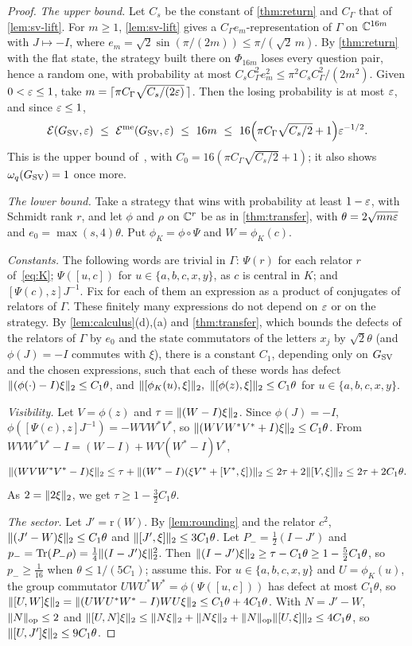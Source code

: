 \begin{proof}
\emph{The upper bound.} Let $C_s$ be the constant of \cref{thm:return} and $C_\Gamma$ that of \cref{lem:sv-lift}. For $m\ge1$,
\cref{lem:sv-lift} gives a $C_\Gamma e_m$-representation of $\Gamma$ on $\mathbb C^{16m}$ with $J\mapsto-I$, where
$e_m=\sqrt2\sin(\pi/(2m))\le\pi/(\sqrt2\,m)$. By \cref{thm:return} with the flat state, the strategy built there on $\Phi_{16m}$ loses every
question pair, hence a random one, with probability at most $C_sC_\Gamma^2e_m^2\le\pi^2C_sC_\Gamma^2/(2m^2)$. Given $0<\varepsilon\le1$, take
$m=\lceil\pi C_\Gamma\sqrt{C_s/(2\varepsilon)}\,\rceil$. Then the losing probability is at most $\varepsilon$, and since $\varepsilon\le1$,
\[
\Ent(\Gsv,\eps)\ \le\ \Entme(\Gsv,\eps)\ \le\ 16m\ \le\ 16\Bigl(\pi C_\Gamma\sqrt{C_s/2}+1\Bigr)\eps^{-1/2}.
\]
This is the upper bound of~\cite[Theorem~1.1]{SV18}, with $C_0=16(\pi C_\Gamma\sqrt{C_s/2}+1)$; it also shows $\omega_{q}(G_{\mathrm{SV}})=1$ once more.

\emph{The lower bound.} Take a strategy that wins with probability at least $1-\varepsilon$, with
Schmidt rank $r$, and let $\phi$ and $\rho$ on $\mathbb C^r$ be as in \cref{thm:transfer}, with $\theta=2\sqrt{mn\varepsilon}$ and $e_0=\max(s,4)\theta$.
Put $\phi_K=\phi\circ\Psi$ and $W=\phi_K(c)$.

\emph{Constants.} The following words are trivial in $\Gamma$: $\Psi(r)$ for each relator $r$ of~\eqref{eq:K}; $\Psi([u,c])$ for
$u\in\{a,b,c,x,y\}$, as $c$ is central in $K$; and $[\Psi(c),z]J^{-1}$. Fix for each of them an expression as a product of conjugates of
relators of $\Gamma$. These finitely many expressions do not depend on $\varepsilon$ or on the strategy. By \cref{lem:calculus}(d),(a) and
\cref{thm:transfer}, which bounds the defects of the relators of $\Gamma$ by $e_0$ and the state commutators of the letters $x_j$ by
$\sqrt2\theta$ (and $\phi(J)=-I$ commutes with $\xi$), there is a constant $C_1$, depending only on $G_{\mathrm{SV}}$ and the chosen expressions, such that each of these words has
defect $\lVert (\phi(\cdot)-I)\xi\rVert_2\le C_1\theta$, and $\lVert [\phi_K(u),\xi]\rVert_2,\ \lVert [\phi(z),\xi]\rVert_2\le C_1\theta$ for $u\in\{a,b,c,x,y\}$.

\emph{Visibility.} Let $V=\phi(z)$ and $\tau=\lVert (W-I)\xi\rVert_2$. Since $\phi(J)=-I$, $\phi([\Psi(c),z]J^{-1})=-WVW^*V^*$, so
$\lVert (WVW^*V^*+I)\xi\rVert_2\le C_1\theta$. From $WVW^*V^*-I=(W-I)+WV(W^*-I)V^*$,
\[
\lVert (WVW^*V^*-I)\xi\rVert_2\le\tau+\lVert (W^*-I)(\xi V^*+[V^*,\xi])\rVert_2\le2\tau+2\lVert [V,\xi]\rVert_2\le2\tau+2C_1\theta .
\]
As $2=\lVert 2\xi\rVert_2$, we get $\tau\ge1-\frac32C_1\theta$.

\emph{The sector.} Let $J'=\mathrm r(W)$. By \cref{lem:rounding} and the relator $c^2$, $\lVert (J'-W)\xi\rVert_2\le C_1\theta$ and
$\lVert [J',\xi]\rVert_2\le3C_1\theta$. Let $P_-=\frac12(I-J')$ and $p_-=\operatorname{Tr}(P_-\rho)=\frac14\lVert (I-J')\xi\rVert_2^2$. Then $\lVert (I-J')\xi\rVert_2\ge\tau-C_1\theta\ge1-\frac52C_1\theta$,
so $p_-\ge\frac1{16}$ when $\theta\le1/(5C_1)$; assume this. For $u\in\{a,b,c,x,y\}$ and $U=\phi_K(u)$, the group commutator
$UWU^*W^*=\phi(\Psi([u,c]))$ has defect at most $C_1\theta$, so $\lVert [U,W]\xi\rVert_2=\lVert (UWU^*W^*-I)WU\xi\rVert_2\le C_1\theta+4C_1\theta$. With
$N=J'-W$, $\lVert N\rVert_{\mathrm{op}}\le2$ and $\lVert [U,N]\xi\rVert_2\le\lVert N\xi\rVert_2+\lVert N\xi\rVert_2+\lVert N\rVert_{\mathrm{op}}\lVert [U,\xi]\rVert_2\le4C_1\theta$, so $\lVert [U,J']\xi\rVert_2\le9C_1\theta$.


\end{proof}
